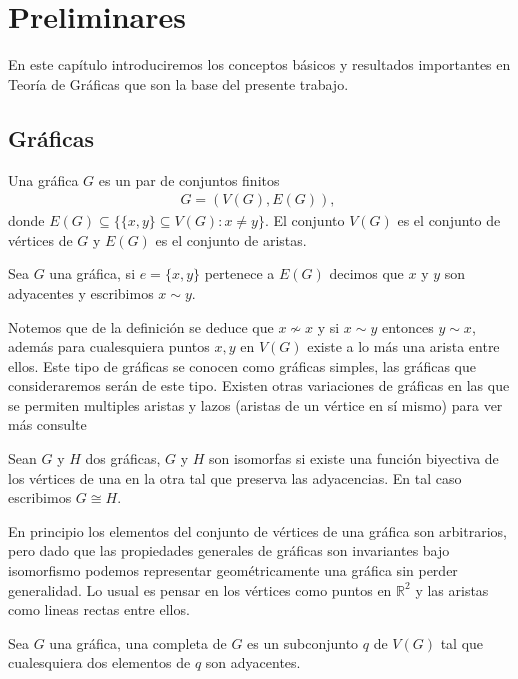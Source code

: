 \chapter{Preliminares}                %
En este capítulo introduciremos los conceptos básicos y resultados importantes en Teoría de Gráficas que son la base del presente trabajo.
\section{Gráficas}
\begin{Defi}[Gráfica]
Una gráfica $G$ es un par de conjuntos finitos 
\begin{eqnarray*}
G=(V(G),E(G)),\
\end{eqnarray*}
donde $E(G)\subseteq \{\{x,y\}\subseteq V(G):x \neq y\}$. El conjunto $V(G)$ es el conjunto de vértices de $G$ y $E(G)$ es el conjunto de aristas.
\end{Defi}
\begin{Defi}
Sea $G$ una gráfica, si $e =\{x,y\}$ pertenece a $E(G)$ decimos que $x$ y $y$ son adyacentes y escribimos $x \sim y$.
\end{Defi}
 Notemos que de la definición se deduce que $x\nsim x$ y si $x\sim y$ entonces $y\sim x$, además para cualesquiera puntos $x,y$ en $V(G)$ existe a lo más una arista entre ellos. Este tipo de gráficas se conocen como gráficas simples, las gráficas que consideraremos serán de este tipo.  
Existen otras variaciones de gráficas en las que se permiten multiples aristas y lazos (aristas de un vértice en sí mismo) para ver más consulte \cite{Harary1969} 

\begin{Defi}[Isomorfismo]
Sean $G$ y $H$ dos gráficas, $G$ y $H$ son isomorfas si existe una función biyectiva de los vértices de una en la otra tal que preserva las adyacencias. En tal caso escribimos $G\cong H$.
\end{Defi}
En principio los elementos del conjunto de vértices de una gráfica son arbitrarios, pero dado que las propiedades generales de gráficas son invariantes bajo isomorfismo podemos representar geométricamente una gráfica sin perder generalidad. Lo usual es pensar en los vértices como puntos en $\mathbb{R}^2$ y las aristas como lineas rectas entre ellos.

\begin{Defi}[Completa]
Sea $G$ una gráfica, una completa de $G$ es un subconjunto $q$ de $V(G)$ tal que cualesquiera dos elementos de $q$ son adyacentes.
\end{Defi}

